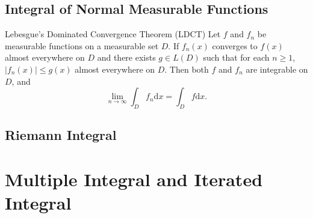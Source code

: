 \subsection{Integral of Normal Measurable Functions}

\begin{theorem}{Lebesgue's Dominated Convergence Theorem (LDCT)}{}
  Let $f$ and $f_n$ be measurable functions on a measurable set $D$.
  If $f_n(x)$ converges to $f(x)$ almost everywhere on $D$ and
  there exists $g \in L(D)$ such that for each $n \geq 1$,
  $|f_n(x)| \leq g(x)$ almost everywhere on $D$.
  Then both $f$ and $f_n$ are integrable on $D$, and
  \begin{equation}
    \lim \limits _{n \rightarrow \infty} \int_D f_n\mathrm{d} x
    = \int_D f\mathrm{d}x.
  \end{equation}
\end{theorem}

\subsection{Riemann Integral}


\section{Multiple Integral and Iterated Integral}







